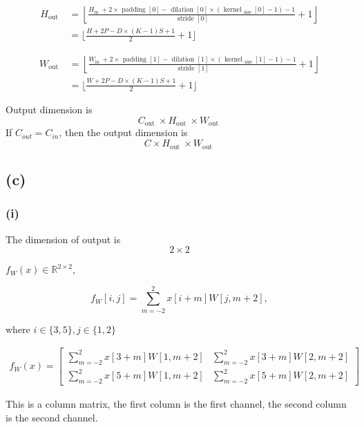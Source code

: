 \begin{enumerate}[(a)]
\begin{align}
    H_{\text {out }}
    &=\left\lfloor\frac{H_{\text {in }}+2 \times \text { padding }[0]-\text { dilation }[0] \times\left(\text { kernel }_{\text {size }}[0]-1\right)-1}{\text { stride }[0]}+1\right\rfloor \\
    &=
    \lfloor
        \frac{ H+2P-D \times (K-1){S}+1}
        {2}
        +1
    \rfloor
\end{align}

\begin{align}
    W_{\text {out }}&=\left\lfloor\frac{W_{\text {in }}+2 \times \text { padding }[1]-\text { dilation }[1] \times\left(\text { kernel }_{\text {size }}[1]-1\right)-1}{\text { stride }[1]}+1\right\rfloor \\
    &= 
    \lfloor
        \frac{ W+2P-D \times (K-1){S}+1}
        {2}
        +1
    \rfloor
\end{align}


Output dimension is 
$$
C_{\text {out }} \times H_{\text {out }} \times W_{\text {out }} 
$$
If $C_{out} = C_{in}$, then the output dimension is
$$
C \times H_{\text {out }} \times W_{\text {out }}
$$


\subsection*{(c)}
\subsubsection*{(i)}


The dimension of output is 
$$
2 \times 2
$$

$f_W(x) \in \mathbb{R}^{2 \times 2}$,

\begin{equation}
    f_W[i,j] = \sum_{m=-2}^2 x[i + m]W[j, m+2],
\end{equation}

where $i \in \{3,5\}, j \in \{1, 2\}$

\begin{align}
    f_W(x)=
    \begin{bmatrix}
        \sum_{m=-2}^2 x[3 + m]W[1, m+2] & \sum_{m=-2}^2 x[3 + m]W[2, m+2] \\
        \sum_{m=-2}^2 x[5 + m]W[1, m+2] & \sum_{m=-2}^2 x[5 + m]W[2, m+2]
    \end{bmatrix}
\end{align}

This is a column matrix, the first column is the first channel, the second column is the second channel.



\end{enumerate}

